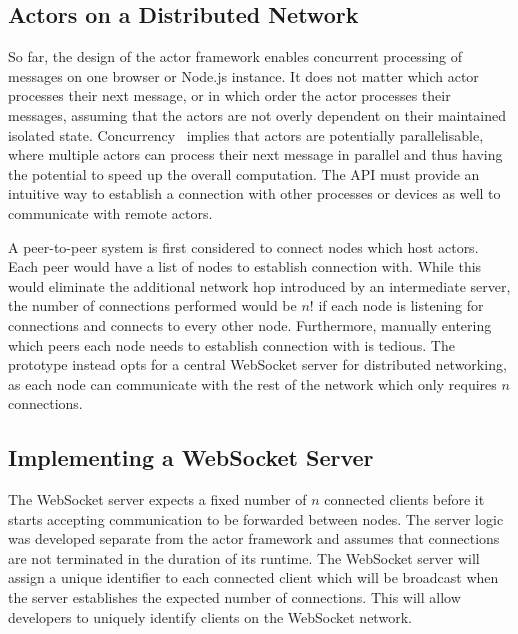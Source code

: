 \documentclass[oneside]{um-fict}
\begin{document}
\subsection{Actors on a Distributed Network}
So far, the design of the actor framework enables concurrent processing of messages on one browser or Node.js instance. It does not matter which actor processes their next message, or in which order the actor processes their messages, assuming that the actors are not overly dependent on their maintained isolated state. Concurrency~\cite{concurrencyjs, concurrency} implies that actors are potentially parallelisable, where multiple actors can process their next message in parallel and thus having the potential to speed up the overall computation. The API must provide an intuitive way to establish a connection with other processes or devices as well to communicate with remote actors.

A peer-to-peer system is first considered to connect nodes which host actors. Each peer would have a list of nodes to establish connection with. While this would eliminate the additional network hop introduced by an intermediate server, the number of connections performed would be $n!$ if each node is listening for connections and connects to every other node. Furthermore, manually entering which peers each node needs to establish connection with is tedious. The prototype instead opts for a central WebSocket server for distributed networking, as each node can communicate with the rest of the network which only requires $n$ connections.

\subsection{Implementing a WebSocket Server}
The WebSocket server expects a fixed number of $n$ connected clients before it starts accepting communication to be forwarded between nodes. The server logic was developed separate from the actor framework and assumes that connections are not terminated in the duration of its runtime. The WebSocket server will assign a unique identifier to each connected client which will be broadcast when the server establishes the expected number of connections. This will allow developers to uniquely identify clients on the WebSocket network.
\end{document}
